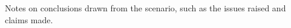 \begin{definition}[Endnote] \label{def:endnote} 
   Notes on conclusions drawn from the scenario, such as the issues raised and claims made. \cite[p. 69]{benyon14}
\end{definition}